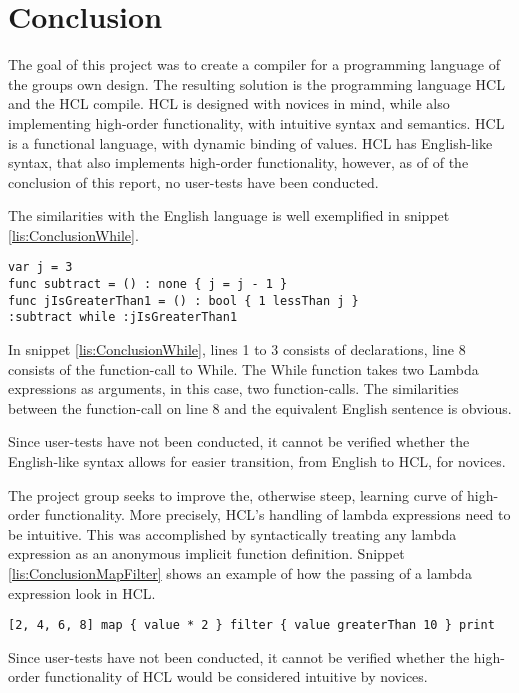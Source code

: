 \chapter{Conclusion}
The goal of this project was to create a compiler for a programming language of the groups own design.
The resulting solution is the programming language HCL and the HCL compile.
HCL is designed with novices in mind, while also implementing high-order functionality, with intuitive syntax and semantics.
HCL is a functional language, with dynamic binding of values.
HCL has English-like syntax, that also implements high-order functionality, however, as of of the conclusion of this report, no user-tests have been conducted.

The similarities with the English language is well exemplified in snippet \ref{lis:ConclusionWhile}.
\begin{lstlisting}[language=hcl,label=lis:ConclusionWhile,caption=English-like syntax example]
var j = 3
func subtract = () : none { j = j - 1 }
func jIsGreaterThan1 = () : bool { 1 lessThan j }
:subtract while :jIsGreaterThan1
\end{lstlisting}
In snippet \ref{lis:ConclusionWhile}, lines 1 to 3 consists of declarations, line 8 consists of the function-call to While.
The While function takes two Lambda expressions as arguments, in this case, two function-calls.
The similarities between the function-call on line 8 and the equivalent English sentence is obvious.

Since user-tests have not been conducted, it cannot be verified whether the English-like syntax allows for easier transition, from English to HCL, for novices.

The project group seeks to improve the, otherwise steep, learning curve of high-order functionality.
More precisely, HCL's handling of lambda expressions need to be intuitive.
This was accomplished by syntactically treating any lambda expression as an anonymous implicit function definition.
Snippet \ref{lis:ConclusionMapFilter} shows an example of how the passing of a lambda expression look in HCL.

\begin{lstlisting}[language=hcl,label=lis:ConclusionMapFilter,caption=High-order functionality in HCL]
[2, 4, 6, 8] map { value * 2 } filter { value greaterThan 10 } print
\end{lstlisting}

Since user-tests have not been conducted, it cannot be verified whether the high-order functionality of HCL would be considered intuitive by novices.

